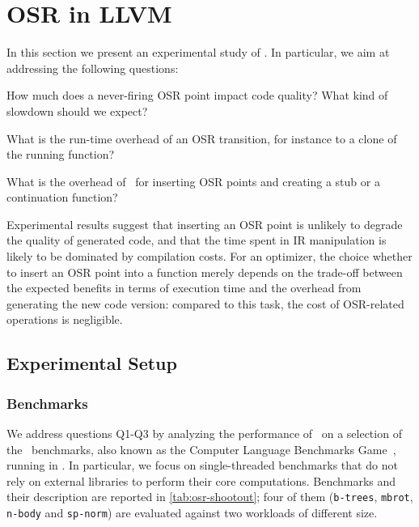 
\section{OSR in LLVM}
\label{se:eval-osrkit}

In this section we present an experimental study of \osrkit. In particular, we aim at addressing the following questions:

\begin{description}[labelindent=1em ,labelsep*=1em,leftmargin=3.5em,itemsep=3pt,parsep=3pt]
\item[Q1] How much does a never-firing OSR point impact code quality? What kind of slowdown should we expect?
\item[Q2] What is the run-time overhead of an OSR transition, for instance to a clone of the running function?
\item[Q3] What is the overhead of \osrkit\ for inserting OSR points and creating a stub or a continuation function?
\end{description}

\noindent Experimental results suggest that inserting an OSR point is unlikely to degrade the quality of generated code, and that the time spent in IR manipulation is likely to be dominated by compilation costs. For an optimizer, the choice whether to insert an OSR point into a function merely depends on the trade-off between the expected benefits in terms of execution time and the overhead from generating the new code version: compared to this task, the cost of OSR-related operations is negligible.

\subsection{Experimental Setup}

\subsubsection*{Benchmarks}
We address questions Q1-Q3 by analyzing the performance of \osrkit\ on a selection of the \shootout\ benchmarks, also known as the Computer Language Benchmarks Game~\cite{shootout}, running in \tinyvm. In particular, we focus on single-threaded benchmarks that do not rely on external libraries to perform their core computations. Benchmarks and their description are reported in \mytable\ref{tab:osr-shootout}; four of them ({\tt b-trees}, {\tt mbrot}, {\tt n-body} and {\tt sp-norm}) are evaluated against two workloads of different size.

